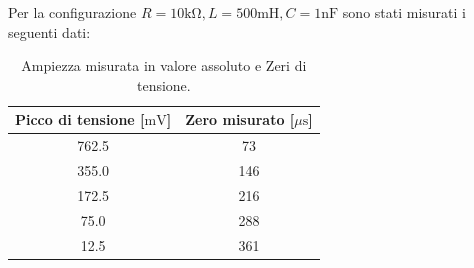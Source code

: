 \documentclass[a4paper,10pt]{article}
\begin{document}
Per la configurazione \(R=10 \si{\kilo \ohm}, L = 500 \si{\milli \henry}, C = 1 \si{\nano \farad}\) sono stati misurati i seguenti dati:


\begin{table}[h!]
    \centering
        \centering
        \begin{tabular}{|c|c|}
        \hline
        \textbf{Picco di tensione} [\(\si{\milli \volt}\)] & \textbf{Zero misurato} [\(\si{\mu \second}\)] \\
        \hline
        762.5 & 73  \\
        \hline
        355.0 & 146 \\
        \hline
        172.5 & 216 \\
        \hline
        75.0 & 288 \\
        \hline
        12.5 & 361 \\
        \hline
        \end{tabular}
        \caption{Ampiezza misurata in valore assoluto e Zeri di tensione.}
\end{table}
    
\end{document}
